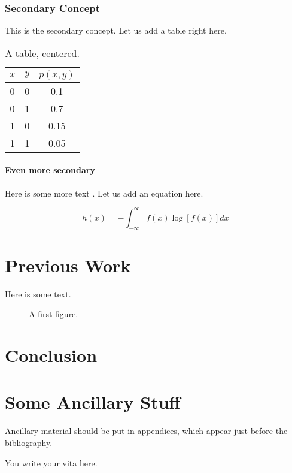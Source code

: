 \documentclass[a4,12pt]{ozu-thesis}
\begin{document}
\subsection{Secondary Concept}

This is the secondary concept. Let us add a table right here.

\begin{table}[h]
\caption{A table, centered.}
\begin{center}
\begin{tabular}{|c|c|c|}
 \hline \hline
$x$ & $y$ & $p(x,y)$ \\
\hline \hline
0 & 0 & 0.1 \\ \hline
0 & 1 & 0.7 \\  \hline
1 & 0 & 0.15 \\ \hline
1 & 1 & 0.05 \\ \hline \hline
\end{tabular}
\end{center}
\end{table}

\subsubsection{Even more secondary}

Here is some more text \cite{knuth:tex}. Let us add an equation here.

\begin{equation}
h(x)=-\int_{-\infty}^{\infty}f(x)\log[f(x)]dx
\end{equation}

\chapter{Previous Work}

Here is some text.

\begin{figure}[h]
\begin{center}
\end{center}
\caption{A first figure.}
\end{figure}

\chapter{Conclusion}

\nocite{*}
\appendix
\chapter{Some Ancillary Stuff}

Ancillary material should be put in appendices, which 
appear just before the bibliography. 


\begin{postliminary}
\begin{vita}
You write your vita here.
\end{vita}
\end{postliminary}
\end{document}
